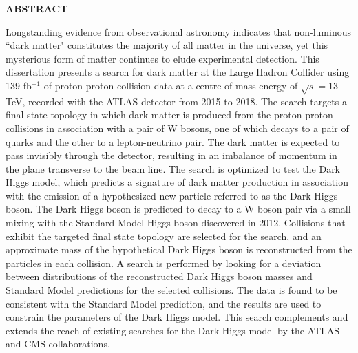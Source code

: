 \newpage
{}


\newpage

\begin{center}
\textbf{ABSTRACT}
\end{center}

Longstanding evidence from observational astronomy indicates that non-luminous ``dark matter" constitutes the majority of all matter in the universe, yet this mysterious form of matter continues to elude experimental detection. This dissertation presents a search for dark matter at the Large Hadron Collider using 139 fb\(^{-1}\) of proton-proton collision data at a centre-of-mass energy of \(\sqrt{s} = 13\,\)TeV, recorded with the ATLAS detector from 2015 to 2018. The search targets a final state topology in which dark matter is produced from the proton-proton collisions in association with a pair of W bosons, one of which decays to a pair of quarks and the other to a lepton-neutrino pair. The dark matter is expected to pass invisibly through the detector, resulting in an imbalance of momentum in the plane transverse to the beam line. The search is optimized to test the Dark Higgs model, which predicts a signature of dark matter production in association with the emission of a hypothesized new particle referred to as the Dark Higgs boson. The Dark Higgs boson is predicted to decay to a W boson pair  via a small mixing with the Standard Model Higgs boson discovered in 2012. Collisions that exhibit the targeted final state topology are selected for the search, and an approximate mass of the hypothetical Dark Higgs boson is reconstructed from the particles in each collision. A search is performed by looking for a deviation between distributions of the reconstructed Dark Higgs boson masses and Standard Model predictions for the selected collisions. The data is found to be consistent with the Standard Model prediction, and the results are used to constrain the parameters of the Dark Higgs model. This search complements and extends the reach of existing searches for the Dark Higgs model by the ATLAS and CMS collaborations.



